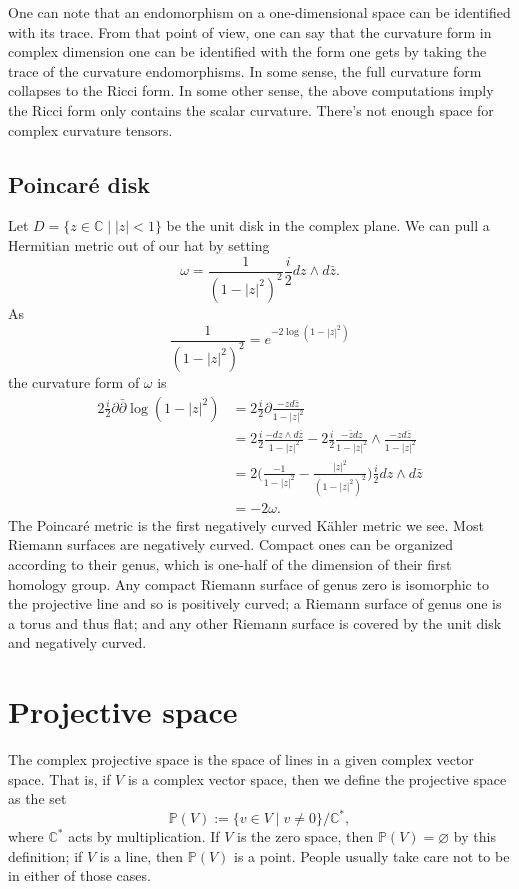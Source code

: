 \documentclass[11pt]{article}
\theoremstyle{definition}
\newcommand{\kk}[1]{\mathbb{#1}}
\begin{document}
One can note that an endomorphism on a one-dimensional space can be identified with its trace. From that point of view, one can say that the curvature form in complex dimension one can be identified with the form one gets by taking the trace of the curvature endomorphisms. In some sense, the full curvature form collapses to the Ricci form. In some other sense, the above computations imply the Ricci form only contains the scalar curvature. There's not enough space for complex curvature tensors.


\subsection{Poincar\'e disk}

Let $D = \{z \in \kk C \mid |z| < 1\}$ be the unit disk in the complex plane. We can pull a Hermitian metric out of our hat by setting
$$
\omega = \frac 1{(1-|z|^2)^2} \frac i2 dz \wedge d\bar z.
$$
As
$$
\frac 1{(1-|z|^2)^2} = e^{-2\log(1-|z|^2)}
$$
the curvature form of $\omega$ is
\begin{align*}
2\frac i2 \partial\bar\partial \log(1-|z|^2)
&= 2\frac i2 \partial \frac{-z d\bar z}{1-|z|^2}
\\
&= 2\frac i2 \frac{- dz \wedge d\bar z}{1-|z|^2}
- 2\frac i2 \frac{-\bar z dz}{1-|z|^2} \wedge \frac{-zd\bar z}{1-|z|^2}
\\
&= 2\biggl(\frac{-1}{1-|z|^2} - \frac{|z|^2}{(1-|z|^2)^2} \biggr) \frac i2 dz \wedge d\bar z
\\
&= -2 \omega.
\end{align*}
The Poincar\'e metric is the first negatively curved K\"ahler metric we see. Most Riemann surfaces are negatively curved. Compact ones can be organized according to their genus, which is one-half of the dimension of their first homology group. Any compact Riemann surface of genus zero is isomorphic to the projective line and so is positively curved; a Riemann surface of genus one is a torus and thus flat; and any other Riemann surface is covered by the unit disk and negatively curved.



\section{Projective space}
\label{sec:orgcfabeed}

The complex projective space is the space of lines in a given complex vector space. That is, if $V$ is a complex vector space, then we define the projective space as the set
$$
\kk P(V) := \{ v \in V \mid v \not= 0 \} / \kk C^*,
$$
where $\kk C^*$ acts by multiplication. If $V$ is the zero space, then $\kk P(V) = \varnothing$ by this definition; if $V$ is a line, then $\kk P(V)$ is a point. People usually take care not to be in either of those cases.
\end{document}

